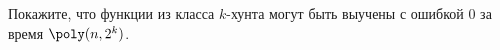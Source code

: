 Покажите, что функции из класса $k$-хунта могут быть выучены с ошибкой $0$ за время $\poly(n, 2^k)$.
